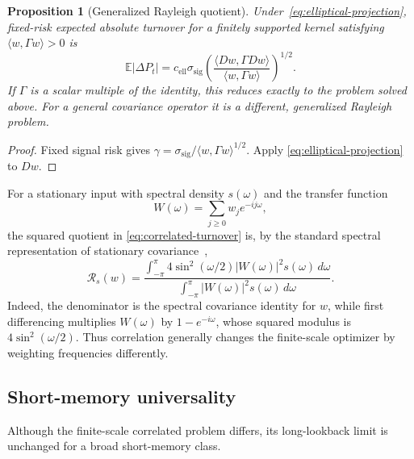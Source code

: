 \documentclass[11pt]{amsart}
\newtheorem{proposition}[theorem]{Proposition}
\theoremstyle{definition}
\theoremstyle{remark}
\newcommand{\Rcal}{\mathcal R}
\begin{document}
\begin{proposition}[Generalized Rayleigh quotient]\label{prop:generalized-rayleigh}
Under~\eqref{eq:elliptical-projection}, fixed-risk expected absolute turnover
for a finitely supported kernel satisfying
$\langle w,\Gamma w\rangle>0$ is
\begin{equation}\label{eq:correlated-turnover}
 \mathbb E|\Delta P_t|
 =c_{\mathrm{ell}}\sigma_{\mathrm{sig}}
 \left(
     \frac{\langle Dw,\Gamma Dw\rangle}
                {\langle w,\Gamma w\rangle}
 \right)^{1/2}.
\end{equation}
If $\Gamma$ is a scalar multiple of the identity, this reduces exactly to the
problem solved above. For a general covariance operator it is a different,
generalized Rayleigh problem.
\end{proposition}
\begin{proof}
Fixed signal risk gives
$\gamma=\sigma_{\mathrm{sig}}/
\langle w,\Gamma w\rangle^{1/2}$. Apply
\eqref{eq:elliptical-projection} to $Dw$.
\end{proof}

For a stationary input with spectral density $s(\omega)$ and the transfer
function
\[
 W(\omega)=\sum_{j\geq0}w_je^{-ij\omega},
\]
the squared quotient in
\eqref{eq:correlated-turnover} is, by the standard spectral representation of
stationary covariance~\cite{BrockwellDavis},
\begin{equation}\label{eq:spectral-rayleigh}
 \Rcal_s(w)=
 \frac{\displaystyle
     \int_{-\pi}^{\pi}4\sin^2(\omega/2)|W(\omega)|^2s(\omega)\,d\omega}
 {\displaystyle
     \int_{-\pi}^{\pi}|W(\omega)|^2s(\omega)\,d\omega}.
\end{equation}
Indeed, the denominator is the spectral covariance identity for $w$, while
first differencing multiplies $W(\omega)$ by $1-e^{-i\omega}$, whose squared
modulus is $4\sin^2(\omega/2)$.
Thus correlation generally changes the finite-scale optimizer by weighting
frequencies differently.

\subsection{Short-memory universality}
\leavevmode\newline
Although the finite-scale correlated problem differs, its long-lookback limit
is unchanged for a broad short-memory class.
\end{document}
